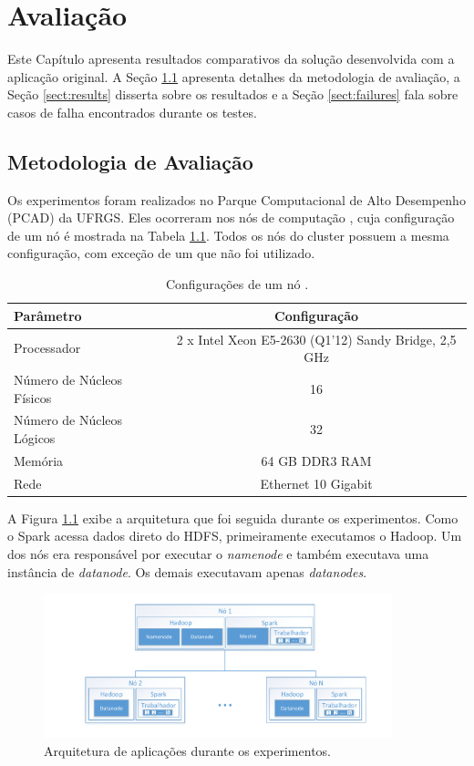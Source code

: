\chapter{Avaliação} \label{ch:evaluation}

Este Capítulo apresenta resultados comparativos da solução desenvolvida com a 
aplicação original. A Seção \ref{sect:methodology} apresenta detalhes da 
metodologia de avaliação, a Seção \ref{sect:results} disserta sobre os 
resultados e a Seção \ref{sect:failures} fala sobre casos de falha encontrados 
durante os testes.


\section{Metodologia de Avaliação} \label{sect:methodology}

Os experimentos foram realizados no Parque Computacional de Alto Desempenho 
(PCAD) da UFRGS. Eles ocorreram nos nós de computação , cuja 
configuração de um nó é mostrada na Tabela \ref{tab:draco_config}. Todos os nós 
do cluster possuem a mesma configuração, com exceção de um que não foi utilizado.

\begin{table}[H]
\centering
\small
\begin{tabular}{l c} \toprule
\textbf{Parâmetro}  &  \textbf{Configuração} \\ 
\midrule
Processador     & 2 x Intel Xeon E5-2630 (Q1'12) Sandy Bridge, 2,5 GHz  
\\
Número de Núcleos Físicos    & 16  \\
Número de Núcleos Lógicos   & 32   \\
Memória       & 64 GB DDR3 RAM   \\
Rede	      & Ethernet 10 Gigabit \\
\end{tabular}
\caption{Configurações de um nó .}
\label{tab:draco_config}
\end{table}


A Figura \ref{fig:experiment_arch} exibe a arquitetura que foi seguida durante 
os experimentos. Como o Spark acessa dados direto do HDFS, primeiramente 
executamos o Hadoop. Um dos nós era responsável por executar o \textit{namenode} 
e também executava uma instância de \textit{datanode}. Os demais executavam 
apenas \textit{datanodes}.


\begin{figure}[ht]
\centerline{
\includegraphics[width=0.9\textwidth]{./img/experiments_arch.pdf}}
 \caption{Arquitetura de aplicações durante os experimentos.}
 \label{fig:experiment_arch}
\end{figure}


